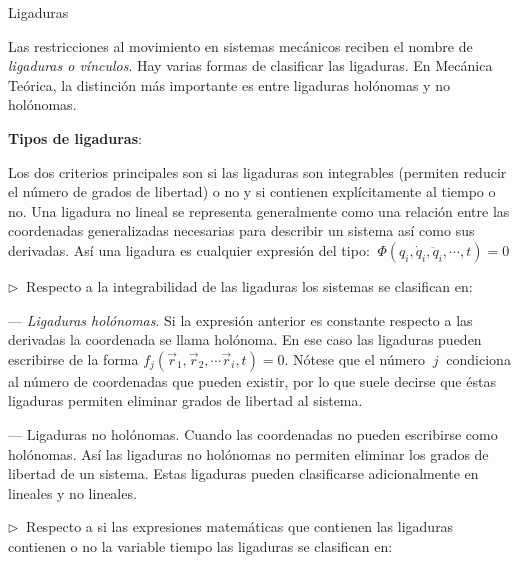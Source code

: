 \begin{myexampleblock}{Ligaduras}

\vspace{2mm} Las restricciones al movimiento en sistemas mecánicos reciben el nombre de \emph{ligaduras o vínculos}. Hay varias formas de clasificar las ligaduras. En Mecánica Teórica, la distinción más importante es entre ligaduras holónomas y no holónomas.

\vspace{2mm}  \textbf{Tipos de ligaduras}:

\vspace{2mm} Los dos criterios principales son si las ligaduras son integrables (permiten reducir el número de grados de libertad) o no y si contienen explícitamente al tiempo o no. Una ligadura no lineal se representa generalmente como una relación entre las coordenadas generalizadas necesarias para describir un sistema así como sus derivadas. Así una ligadura es cualquier expresión del tipo: $\ \Phi(q_i,\dot q_i, \ddot q_i,\cdots ,t)=0$

\begin{adjustwidth}{20pt}{5pt}
\vspace{2mm} $\triangleright \ $ Respecto a la integrabilidad de las ligaduras los sistemas se clasifican en:

\begin{adjustwidth}{20pt}{5pt}
\vspace{2mm} --- \emph{Ligaduras holónomas}. Si la expresión anterior es constante respecto a las derivadas la coordenada se llama holónoma. En ese caso las ligaduras pueden escribirse de la forma $f_j(\vec r_1, \vec r_2, \cdots \vec r_i, t)=0$. Nótese que el número $\ j \ $  condiciona al número de coordenadas que pueden existir, por lo que suele decirse que éstas ligaduras permiten eliminar grados de libertad al sistema.

\vspace{2mm} --- Ligaduras no holónomas. Cuando las coordenadas no pueden escribirse como holónomas. Así las ligaduras no holónomas no permiten eliminar los grados de libertad de un sistema. Estas ligaduras pueden clasificarse adicionalmente en lineales y no lineales.
\end{adjustwidth}

\vspace{2mm} $\triangleright \ $ Respecto a si las expresiones matemáticas que contienen las ligaduras contienen o no la variable tiempo las ligaduras se clasifican en:


\end{adjustwidth}
\end{myexampleblock}
